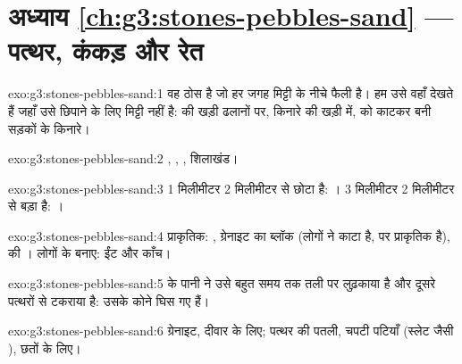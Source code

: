 \section*{अध्याय \ref{ch:g3:stones-pebbles-sand} --- पत्थर, कंकड़ और रेत}

\begin{solution}{exo:g3:stones-pebbles-sand:1}
 वह ठोस  है जो हर जगह मिट्टी के नीचे फैली है। हम उसे
वहाँ देखते हैं जहाँ उसे छिपाने के लिए मिट्टी नहीं है:  की खड़ी
ढलानों पर,  किनारे की खड़ी  में,  को काटकर बनी सड़कों के
किनारे।
\end{solution}

\begin{solution}{exo:g3:stones-pebbles-sand:2}
, , , शिलाखंड।
\end{solution}

\begin{solution}{exo:g3:stones-pebbles-sand:3}
1 मिलीमीटर 2 मिलीमीटर से छोटा है: । 3 मिलीमीटर 2 मिलीमीटर से बड़ा है:
।
\end{solution}

\begin{solution}{exo:g3:stones-pebbles-sand:4}
प्राकृतिक: , ग्रेनाइट का ब्लॉक (लोगों ने काटा है, पर  प्राकृतिक
है),   की । लोगों के बनाए: ईंट और काँच।
\end{solution}

\begin{solution}{exo:g3:stones-pebbles-sand:5}
 के पानी ने उसे बहुत समय तक तली पर लुढ़काया है और दूसरे पत्थरों से
टकराया है: उसके कोने घिस गए हैं।
\end{solution}

\begin{solution}{exo:g3:stones-pebbles-sand:6}
ग्रेनाइट, दीवार के लिए; पत्थर की पतली, चपटी पटियाँ (स्लेट जैसी ), छतों के लिए।
\end{solution}

